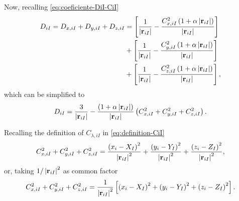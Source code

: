 Now, recalling \cref{eq:coeficiente-DiI-CiI} 
\begin{align}
    \notag
    D_{iI}
    =
    D_{x,iI}
    +
    D_{y,iI}
    +
    D_{z,iI}
    &=
    \left[
        \frac{
            1
        }{
            \left| \boldsymbol{\mathrm{r}}_{iI} \right|
        }
        -
        \frac{
            C_{x,iI}^{2}
            \left( 
                1 + \alpha \left| \boldsymbol{\mathrm{r}}_{iI} \right|
            \right)
        }{
            \left| \boldsymbol{\mathrm{r}}_{iI} \right|
        }
    \right]
    \\
    \notag
    \phantom{=}
    &+
    \left[
        \frac{
            1
        }{
            \left| \boldsymbol{\mathrm{r}}_{iI} \right|
        }
        -
        \frac{
            C_{y,iI}^{2}
            \left( 
                1 + \alpha \left| \boldsymbol{\mathrm{r}}_{iI} \right|
            \right)
        }{
            \left| \boldsymbol{\mathrm{r}}_{iI} \right|
        }
    \right]
    \\
    \phantom{=}
    &+
    \left[
        \frac{
            1
        }{
            \left| \boldsymbol{\mathrm{r}}_{iI} \right|
        }
        -
        \frac{
            C_{z,iI}^{2}
            \left( 
                1 + \alpha \left| \boldsymbol{\mathrm{r}}_{iI} \right|
            \right)
        }{
            \left| \boldsymbol{\mathrm{r}}_{iI} \right|
        }
    \right]
    ,
\end{align}
which can be simplified to
\begin{equation} \label{eq:DiI-1}
    D_{iI}
    =
    \frac{3}{\left| \boldsymbol{\mathrm{r}}_{iI} \right|}
    -
    \frac{
        \left( 
            1 + \alpha \left| \boldsymbol{\mathrm{r}}_{iI} \right|
        \right)
    }{
        \left| \boldsymbol{\mathrm{r}}_{iI} \right|
    }
    \left( 
        C_{x,iI}^{2} + C_{y,iI}^{2} + C_{z,iI}^{2}
    \right)
    .
\end{equation}

Recalling the definition of $C_{\lambda,iI}$ in \cref{eq:definition-CiI}
\begin{equation}
    C_{x,iI}^{2} + C_{y,iI}^{2} + C_{z,iI}^{2}
    =
    \frac{\left( x_i - X_I \right)^{2}}{\left| \boldsymbol{\mathrm{r}}_{iI} \right|^{2}} +
    \frac{\left( y_i - Y_I \right)^{2}}{\left| \boldsymbol{\mathrm{r}}_{iI} \right|^{2}} +
    \frac{\left( z_i - Z_I \right)^{2}}{\left| \boldsymbol{\mathrm{r}}_{iI} \right|^{2}}
    ,
\end{equation}
or, taking $1 / \left| \boldsymbol{\mathrm{r}}_{iI} \right|^{2}$ as common factor
\begin{equation}
    C_{x,iI}^{2} + C_{y,iI}^{2} + C_{z,iI}^{2}
    =
    \frac{1}{\left| \boldsymbol{\mathrm{r}}_{iI} \right|^{2}}
    \left[ 
        \left( x_i - X_I \right)^{2} +
        \left( y_i - Y_I \right)^{2} +
        \left( z_i - Z_I \right)^{2}
    \right]
    .
\end{equation}

